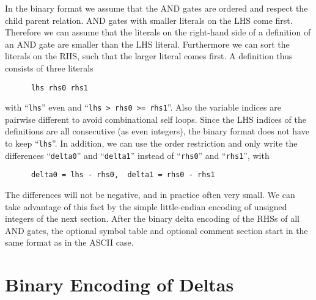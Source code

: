 \documentclass[10pt]{llncs}
\begin{document}
  In the binary format we assume that the AND gates are ordered and respect
  the child parent relation.  AND gates with smaller literals on the LHS
  come first.  Therefore we can assume that the literals on the right-hand
  side of a definition of an AND gate are smaller than the LHS literal.
  Furthermore we can sort the literals on the RHS, such that the larger
  literal comes first.  A definition thus consists of three literals
\begin{verbatim}
      lhs rhs0 rhs1
\end{verbatim}
  with ``\texttt{lhs}'' even and ``\texttt{lhs > rhs0 >= rhs1}''.  Also the variable indices are
  pairwise different to avoid combinational self loops.  Since the LHS
  indices of the definitions are all consecutive (as even integers),
  the binary format does not have to keep ``\texttt{lhs}''.  In addition, we can use
  the order restriction and only write the differences ``\texttt{delta0}'' and
  ``\texttt{delta1}''
  instead of ``\texttt{rhs0}'' and ``\texttt{rhs1}'', with
\begin{verbatim}
      delta0 = lhs - rhs0,  delta1 = rhs0 - rhs1
\end{verbatim}
  The differences will not be negative, and in practice often very small.
  We can take advantage of this fact by the simple little-endian encoding of
  unsigned integers of the next section.  After the binary delta encoding of
  the RHSs of all AND gates, the optional symbol table and optional comment
  section start in the same format as in the ASCII case.

\section{Binary Encoding of Deltas}
  
\end{document}
